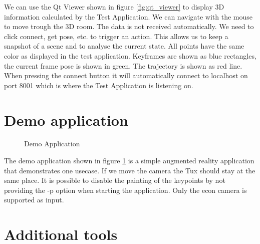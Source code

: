 \documentclass[11pt,a4paper,titlepage,oneside]{report}
\begin{document}
We can use the Qt Viewer shown in figure \ref{fig:qt_viewer} to display 3D information calculated by the Test Application. We can navigate with the mouse to move trough the 3D room. The data is not received automatically. We need to click connect, get pose, etc. to trigger an action. This allows us to keep a snapshot of a scene and to analyse the current state. All points have the same color as displayed in the test application. Keyframes are shown as blue rectangles, the current frame pose is shown in green. The trajectory is shown as red line. When pressing the connect button it will automatically connect to localhost on port 8001 which is where the Test Application is listening on.

\section{Demo application}
\begin{figure}[H]
  \centering
  \qquad
  \caption{Demo Application}\label{fig:demo_application}
\end{figure}

The demo application shown in figure \ref{fig:demo_application} is a simple augmented reality application that demonstrates one usecase. If we move the camera the Tux should stay at the same place. It is possible to disable the painting of the keypoints by not providing the -p option when starting the application. Only the econ camera is supported as input.

\section{Additional tools}
\end{document}
